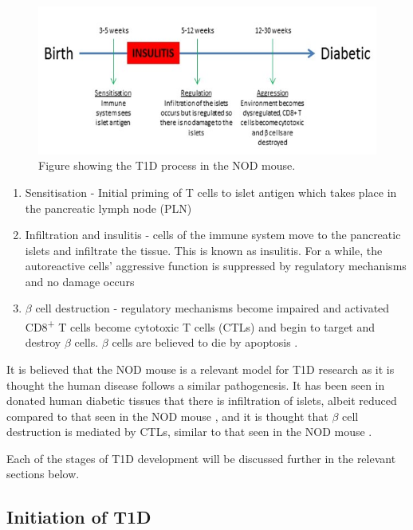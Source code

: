 \begin{figure}
\includegraphics[width=\textwidth]{Figures/Diseasecourse.png}
\caption{Figure showing the T1D process in the NOD mouse.}
\label{fig:diseasecourse}
\end{figure}

\begin{enumerate}
\item Sensitisation - Initial priming of T cells to islet antigen which takes place in the pancreatic lymph node (PLN)
\item Infiltration and insulitis - cells of the immune system move to the pancreatic islets and infiltrate the tissue. This is known as insulitis. For a while, the autoreactive cells' aggressive function is suppressed by regulatory mechanisms and no damage occurs
\item $\beta$ cell destruction - regulatory mechanisms become impaired and activated CD8\textsuperscript{+} T cells become cytotoxic T cells (CTLs) and begin to target and destroy $\beta$ cells. $\beta$ cells are believed to die by apoptosis \citep{Cnop2005}.
\end{enumerate}

It is believed that the NOD mouse is a relevant model for T1D research as it is thought the human disease follows a similar pathogenesis.
It has been seen in donated human diabetic tissues that there is infiltration of islets, albeit reduced compared to that seen in the NOD mouse \citep{Veld2014}, and it is thought that $\beta$ cell destruction is mediated by CTLs, similar to that seen in the NOD mouse \citep{Hanafusa2008}. 


Each of the stages of T1D development will be discussed further in the relevant sections below.


\subsection{Initiation of T1D}



